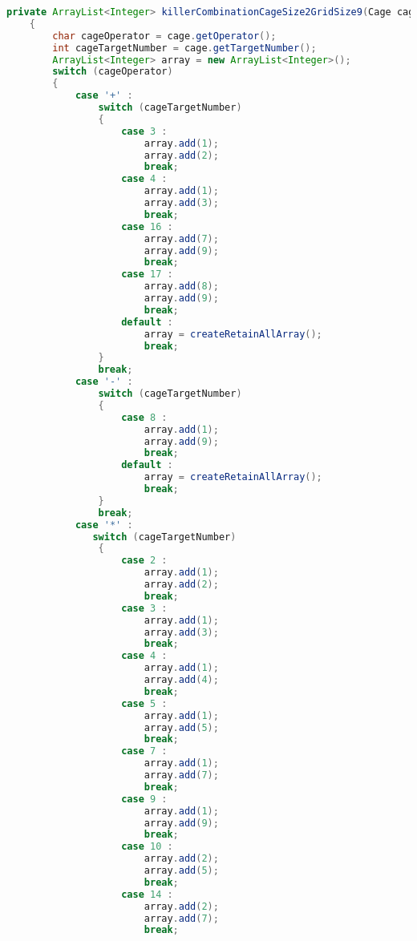 \begin{lstlisting}[language=Java,basicstyle=\tiny,caption=SolverRuleBased.java]
    private ArrayList<Integer> killerCombinationCageSize2GridSize9(Cage cage)
    {
        char cageOperator = cage.getOperator();
        int cageTargetNumber = cage.getTargetNumber();
        ArrayList<Integer> array = new ArrayList<Integer>();
        switch (cageOperator)
        {
            case '+' :
                switch (cageTargetNumber)
                {
                    case 3 :
                        array.add(1);
                        array.add(2);
                        break;
                    case 4 :  
                        array.add(1);
                        array.add(3);
                        break;
                    case 16 :
                        array.add(7);
                        array.add(9);
                        break;
                    case 17 :
                        array.add(8);
                        array.add(9);
                        break;
                    default :
                        array = createRetainAllArray();
                        break;
                }
                break;
            case '-' :
                switch (cageTargetNumber)
                {
                    case 8 :
                        array.add(1);
                        array.add(9);
                        break;
                    default :
                        array = createRetainAllArray();
                        break;
                }
                break;
            case '*' :
               switch (cageTargetNumber)
                {
                    case 2 :
                        array.add(1);
                        array.add(2);
                        break;
                    case 3 :
                        array.add(1);
                        array.add(3);
                        break;
                    case 4 :
                        array.add(1);
                        array.add(4);
                        break;
                    case 5 :
                        array.add(1);
                        array.add(5);
                        break;
                    case 7 :
                        array.add(1);
                        array.add(7);
                        break;
                    case 9 :
                        array.add(1);
                        array.add(9);
                        break;
                    case 10 :
                        array.add(2);
                        array.add(5);
                        break;
                    case 14 :
                        array.add(2);
                        array.add(7);
                        break;

\end{lstlisting}
